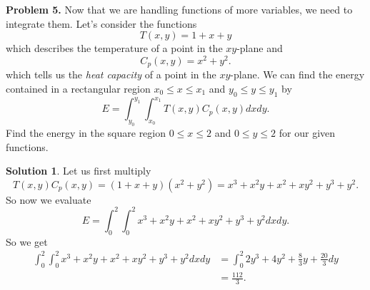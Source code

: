 \documentclass[12pt]{report} %
\theoremstyle{definition}
\newtheorem{solution}{Solution}
\begin{document}
\noindent\textbf{Problem 5.} Now that we are handling functions of more variables, we need to integrate them.  Let's consider the functions
\[
T(x,y) = 1+ x+y
\]
which describes the temperature of a point in the $xy$-plane and
\[
C_p(x,y) = x^2+y^2.
\]
which tells us the \emph{heat capacity} of a point in the $xy$-plane. We can find the energy contained in a rectangular region $x_0\leq x \leq x_1$ and $y_0\leq y \leq y_1$ by
\[
E = \int_{y_0}^{y_1} \int_{x_0}^{x_1} T(x,y)C_p(x,y)dxdy.
\]
Find the energy in the square region $0 \leq x \leq 2$ and $0\leq y \leq 2$ for our given functions.
\begin{solution}
Let us first multiply
\[
T(x,y)C_p(x,y) = (1+x+y)(x^2+y^2)=x^3+x^2y+x^2+xy^2+y^3+y^2.
\]
So now we evaluate
\[
E=\int_0^2 \int_0^2 x^3+x^2y+x^2+xy^2+y^3+y^2 dx dy.
\]
So we get
\begin{align*}
    \int_0^2 \int_0^2 x^3+x^2y+x^2+xy^2+y^3+y^2 dx dy &= \int_0^2 2y^3+4y^2+\frac{8}{3}y+\frac{20}{3} dy\\
    &=\frac{112}{3}.
\end{align*}

\end{solution}
\end{document}

